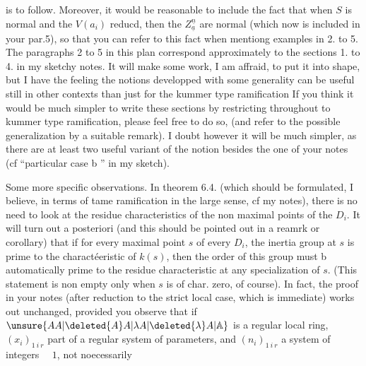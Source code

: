 is to follow. Moreover, it would be reasonable to include the fact that when
$S$ is normal and the $V(a_i)$ reducd,
then the $Z^{\underline{n}}_{\underline{a}}$ are normal (which now is included
in your par.5), so that you can refer to this fact when
mentiong
examples in  2. to 5. The paragraphs 2 to 5
in this plan correspond approximately to the sections 1. to 4. in my sketchy
notes. It will make some work, I am affraid, to put it into shape, but I have
the feeling the notions developped with some generality can be useful still
in other contexts than just for the kummer type ramification %
If you think it would be much simpler to write these sections by restricting
throughout to kummer type ramification, please feel free to do so, (and refer
to the possible generalization by a suitable remark). I doubt however it will
be much simpler, as there are at least two useful variant %
of the notion besides the one of your notes (cf ``particular case b '' in my
sketch).

Some more specific observations. In theorem 6.4. (which should be formulated,
I believe, in terms of tame ramification in the large sense, cf my notes),
there is no need to look at the residue characteristics of the non maximal
points of the $D_i$. It will turn out a posteriori (and this should be pointed
out in a reamrk or corollary) that  if for every maximal point $s$
of every $D_i$, the inertia group at $s$ is prime
to the charactéeristic of $k(s)$, then the order of this group must
b automatically prime to the residue
characteristic at any specialization of $s$. (This statement is non empty only
when $s$ is of char. zero, of course). In fact, the proof in your notes (after
reduction to the strict local case, which is immediate) works out unchanged,
provided you observe that if
$\unsure{AA|\deleted{A}A|\lambda A|\deleted{\lambda}A|\mathbb{A}}$ is a
regular local ring, $(x_i)_{1\ i\ r}$ part of a regular system of parameters,
and $(n_i)_{1\ i\ r}$ a system of integers $\quad1$,
not noecessarily
